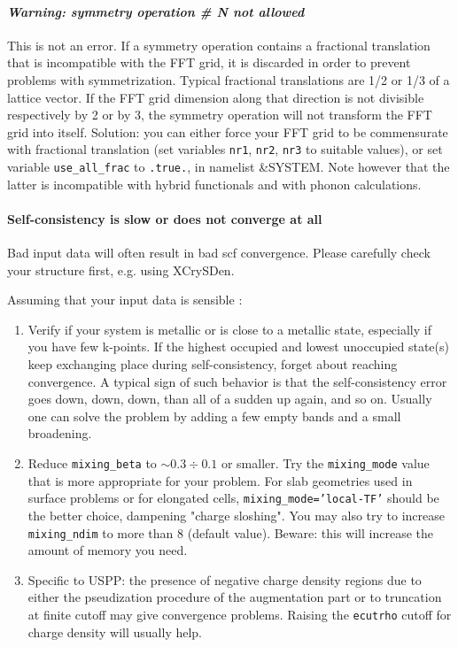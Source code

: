 \documentclass[12pt,a4paper]{article}
\begin{document}
\paragraph{{\em Warning: symmetry operation \# N not allowed}}
This is not an error.  If a symmetry operation contains a fractional
translation that is incompatible with the FFT grid, it is discarded in
order to prevent problems with symmetrization. Typical fractional 
translations are 1/2 or 1/3 of a lattice vector. If the FFT grid
dimension along that direction is not divisible respectively by 2 or
by 3, the symmetry operation will not transform the FFT grid into
itself. Solution: you can either force your FFT grid to be
commensurate with fractional translation (set variables 
\texttt{nr1}, \texttt{nr2}, \texttt{nr3} to suitable values), or
set variable \texttt{use\_all\_frac} to \texttt{.true.}, in namelist
\&SYSTEM. Note however that the latter is incompatible with
hybrid functionals and with phonon calculations.

\paragraph{Self-consistency is slow or does not converge at all}

Bad input data will often result in bad scf convergence. Please 
carefully check your structure first, e.g. using XCrySDen.
 
Assuming that your input data is sensible :
\begin{enumerate}
\item Verify if your system is metallic or is close to a metallic
  state, especially if you have few k-points. If the highest occupied
  and lowest unoccupied state(s) keep exchanging place during
  self-consistency, forget about reaching convergence. A typical sign
  of such behavior is that the self-consistency error goes down, down,
  down, than all of a sudden up again, and so on. Usually one can
  solve the problem by adding a few empty bands and a small
  broadening. 
\item Reduce \texttt{mixing\_beta} to $\sim 0.3\div
  0.1$ or smaller. Try the \texttt{mixing\_mode} value that is more
  appropriate for your problem. For slab geometries used in surface
  problems or for elongated cells,  \texttt{mixing\_mode='local-TF'}
  should be the better choice, dampening "charge sloshing". You may
  also try to increase \texttt{mixing\_ndim} to more than 8 (default
  value). Beware: this will increase the amount of memory you need. 
\item Specific to USPP: the presence of negative charge density
  regions due to either the pseudization procedure of the augmentation
  part or to truncation at finite cutoff may give convergence
  problems. Raising the \texttt{ecutrho} cutoff for charge density will
  usually help.
\end{enumerate}
\end{document}
